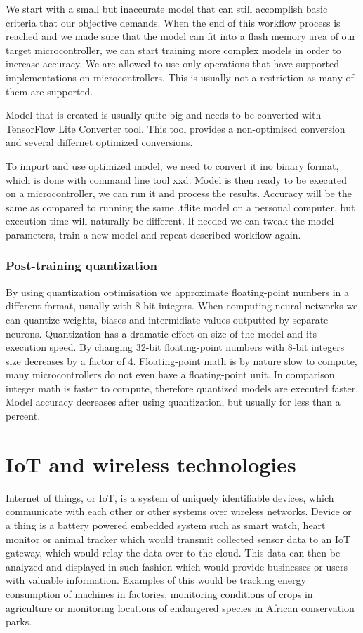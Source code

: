 We start with a small but inaccurate model that can still accomplish basic criteria that our objective demands.
When the end of this workflow process is reached and we made sure that the model can fit into a flash memory area of our target microcontroller, we can start training more complex models in order to increase accuracy.
We are allowed to use only operations that have supported implementations on microcontrollers.
This is usually not a restriction as many of them are supported.

Model that is created is usually quite big and needs to be converted with TensorFlow Lite Converter tool.
This tool provides a non-optimised conversion and several differnet optimized conversions.

To import and use optimized model, we need to convert it ino binary format, which is done with command line tool xxd.
Model is then ready to be executed on a microcontroller, we can run it and process the results.
Accuracy will be the same as compared to running the same .tflite model on a personal computer, but execution time will naturally be different.
If needed we can tweak the model parameters, train a new model and repeat described workflow again.


\subsubsection{ Post-training quantization}

By using quantization optimisation we approximate floating-point numbers in a different format, usually with 8-bit integers.
When computing neural networks we can quantize weights, biases and intermidiate values outputted by separate neurons. 
Quantization has a dramatic effect on size of the model and its execution speed.
By changing 32-bit floating-point numbers with 8-bit integers size decreases by a factor of 4.
Floating-point math is by nature slow to compute, many microcontrollers do not even have a floating-point unit.
In comparison integer math is faster to compute, therefore quantized models are executed faster.
Model accuracy decreases after using quantization, but usually for less than a percent.
 

\section{ IoT and wireless technologies}

Internet of things, or IoT, is a system of uniquely identifiable devices, which communicate with each other or other systems over wireless networks\cite{IoT}.
Device or a thing is a battery powered embedded system such as smart watch, heart monitor or animal tracker which would transmit collected sensor data to an IoT gateway, which would relay the data over to the cloud.
This data can then be analyzed and displayed in such fashion which would provide businesses or users with valuable information.
Examples of this would be tracking energy consumption of machines in factories, monitoring conditions of crops in agriculture or monitoring locations of endangered species in African conservation parks.

